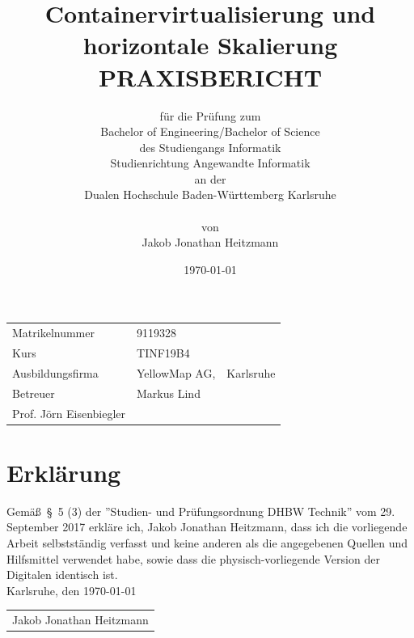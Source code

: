 \documentclass[12pt,a4paper]{scrartcl}
\title{\Large{\bfseries Containervirtualisierung und horizontale Skalierung}\vspace{1cm}
	\large PRAXISBERICHT\vspace{1cm}}
\author{
	\normalsize für die Prüfung zum\\
	\normalsize Bachelor of Engineering/Bachelor of Science\\
	\normalsize des Studiengangs Informatik\\
	\normalsize Studienrichtung Angewandte Informatik\\
	\normalsize an der\\
	\normalsize Dualen Hochschule Baden-Württemberg Karlsruhe\\\\
	\normalsize von\\
	\normalsize Jakob Jonathan Heitzmann
}
\date{\today}
\begin{document}
\maketitle
\vspace*{\fill}
\thispagestyle{empty}



\begin{tabular}{p{5cm}ll}
	Matrikelnummer & 9119328\\
	Kurs & TINF19B4\\
	Ausbildungsfirma & YellowMap AG, & Karlsruhe\\
	Betreuer & Markus Lind\\
	Prof. Jörn Eisenbiegler
\end{tabular}

\newpage


\section*{Erkl\"arung}

Gem\"a\ss\ \S\ 5 (3) der ''Studien- und Pr\"ufungsordnung DHBW Technik'' vom 29. September 2017 erkl\"are ich, Jakob Jonathan Heitzmann, dass ich die vorliegende Arbeit selbstst\"andig verfasst und keine anderen als die angegebenen Quellen und Hilfsmittel verwendet habe, sowie dass die physisch-vorliegende Version der Digitalen identisch ist.\\

\hspace*{0.5cm}
Karlsruhe, den \today

\vspace*{2cm}

\begin{tabular}{@{}l@{}}\hline
\rule{0pt}{2ex}
Jakob Jonathan Heitzmann
\end{tabular}
\newpage

\tableofcontents
{}
\newpage
\listoffigures
{}
\newpage
\listoftables
{}
\newpage
\printglossary
{}
\newpage

\end{document}
